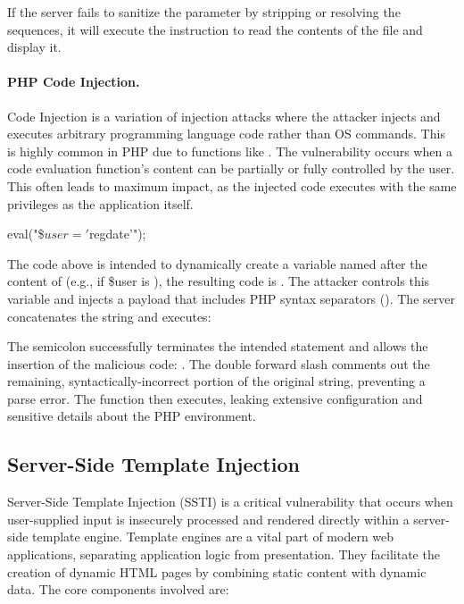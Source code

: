 If the server fails to sanitize the  parameter by stripping or resolving the  sequences, it will execute the instruction to read the contents of the  file and display it.

\paragraph{PHP Code Injection.} Code Injection is a variation of injection attacks where the attacker injects and executes arbitrary programming language code rather than OS commands. This is highly common in PHP due to functions like . The vulnerability occurs when a code evaluation function's content can be partially or fully controlled by the user. This often leads to maximum impact, as the injected code executes with the same privileges as the application itself.

\begin{phpcode}
    eval("\$$user = '$regdate'");
\end{phpcode}

The code above is intended to dynamically create a variable named after the content of  (e.g., if \$user is ), the resulting code is . The attacker controls this variable and injects a payload that includes PHP syntax separators (\NewTexttt{;}). The server concatenates the string and executes:


The semicolon successfully terminates the intended statement and allows the insertion of the malicious code: . The double forward slash comments out the remaining, syntactically-incorrect portion of the original string, preventing a parse error. The function  then executes, leaking extensive configuration and sensitive details about the PHP environment.

\subsection{Server-Side Template Injection}
Server-Side Template Injection (SSTI) is a critical vulnerability that occurs when user-supplied input is insecurely processed and rendered directly within a server-side template engine. Template engines are a vital part of modern web applications, separating application logic from presentation. They facilitate the creation of dynamic HTML pages by combining static content with dynamic data. The core components involved are:

